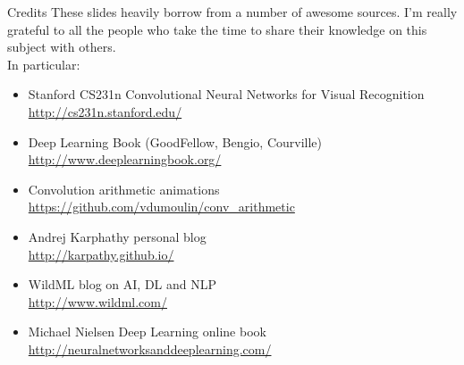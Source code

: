 \begin{frame}[t, allowframebreaks]{Credits}
These slides heavily borrow from a number of awesome sources. I'm really grateful to all the people who take the time to share their knowledge on this subject with others.\\
\vspace{0.5cm}
In particular:
\begin{itemize}
\item Stanford CS231n Convolutional Neural Networks for Visual Recognition\\
\url{http://cs231n.stanford.edu/}
\item Deep Learning Book (GoodFellow, Bengio, Courville)\\
\url{http://www.deeplearningbook.org/}
\item Convolution arithmetic animations\\
\url{https://github.com/vdumoulin/conv_arithmetic}
\item Andrej Karphathy personal blog\\
\url{http://karpathy.github.io/}
\item WildML blog on AI, DL and NLP\\
\url{http://www.wildml.com/}
\item Michael Nielsen Deep Learning online book
\url{http://neuralnetworksanddeeplearning.com/}
\end{itemize}
\end{frame}